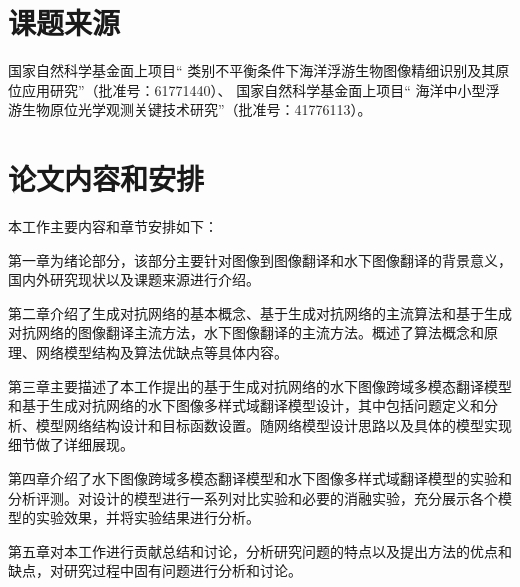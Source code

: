 \section{课题来源}
国家自然科学基金面上项目“ 类别不平衡条件下海洋浮游生物图像精细识别及其原位应用研究”（批准号：61771440）、   国家自然科学基金面上项目“ 海洋中小型浮游生物原位光学观测关键技术研究”（批准号：41776113）。


\section{论文内容和安排}
本工作主要内容和章节安排如下：

第一章为绪论部分，该部分主要针对图像到图像翻译和水下图像翻译的背景意义，国内外研究现状以及课题来源进行介绍。

第二章介绍了生成对抗网络的基本概念、基于生成对抗网络的主流算法和基于生成对抗网络的图像翻译主流方法，水下图像翻译的主流方法。概述了算法概念和原理、网络模型结构及算法优缺点等具体内容。

第三章主要描述了本工作提出的基于生成对抗网络的水下图像跨域多模态翻译模型和基于生成对抗网络的水下图像多样式域翻译模型设计，其中包括问题定义和分析、模型网络结构设计和目标函数设置。随网络模型设计思路以及具体的模型实现细节做了详细展现。

第四章介绍了水下图像跨域多模态翻译模型和水下图像多样式域翻译模型的实验和分析评测。对设计的模型进行一系列对比实验和必要的消融实验，充分展示各个模型的实验效果，并将实验结果进行分析。

第五章对本工作进行贡献总结和讨论，分析研究问题的特点以及提出方法的优点和缺点，对研究过程中固有问题进行分析和讨论。

